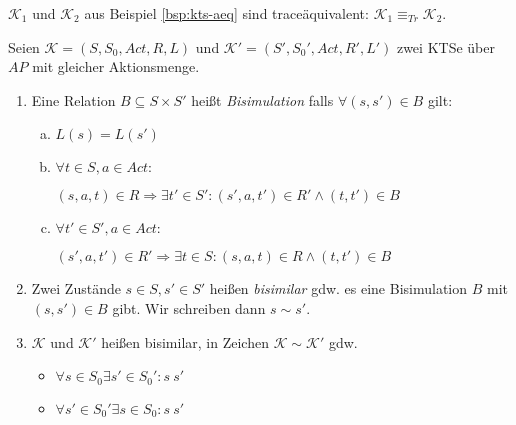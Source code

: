 \begin{bsp}
	$\mathcal{K}_1$ und $\mathcal{K}_2$ aus Beispiel \ref{bsp:kts-aeq} sind traceäquivalent: $\mathcal{K}_1 \equiv_{Tr} \mathcal{K}_2$.
\end{bsp}

\begin{defn}
	\label{def:bisimulation}
	Seien $\mathcal{K} = (S, S_0, Act, R, L)$ und $\mathcal{K'} = (S', S_0', Act, R', L')$ zwei KTSe über $AP$ mit gleicher Aktionsmenge.
	\begin{enumerate}
		\item Eine Relation $B \subseteq S \times S'$ heißt \emph{Bisimulation} falls $\forall (s, s') \in B$ gilt:
		\begin{enumerate}[a)]
			\item $L(s)=L(s')$
			\item $\forall t \in S, a \in Act:$
			
			$(s,a,t) \in R \Rightarrow \exists t' \in S': (s', a, t') \in R' \wedge (t, t') \in B$
			
			\item $\forall t' \in S', a \in Act:$
			
			$(s',a,t') \in R' \Rightarrow \exists t \in S: (s, a, t) \in R \wedge (t, t') \in B$
		\end{enumerate}
	
	\item Zwei Zustände $s \in S, s' \in S'$ heißen \emph{bisimilar} gdw. es eine Bisimulation $B$ mit $(s, s') \in B$ gibt. Wir schreiben dann $s \sim s'$.
	
	\item $\mathcal{K}$ und $\mathcal{K'}$ heißen bisimilar, in Zeichen $\mathcal{K} \sim \mathcal{K'}$ gdw.
	\begin{itemize}
		\item $\forall s \in S_0 \exists s' \in S_0' : s ~ s'$
		\item $\forall s' \in S_0' \exists s \in S_0 : s ~ s'$
	\end{itemize}
	\end{enumerate}
\end{defn}

